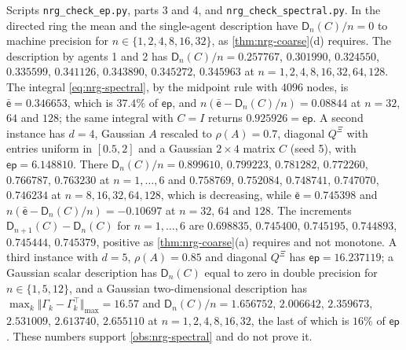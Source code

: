 \begin{numcheck}\label{chk:nrg-coarse}
Scripts \texttt{nrg\_\allowbreak check\_\allowbreak ep.py}, parts 3 and 4, and \texttt{nrg\_\allowbreak check\_\allowbreak spectral.py}. In the directed ring the mean and the single-agent description have $\mathsf D_n(C)/n=0$ to machine precision for $n\in\{1,2,4,8,16,32\}$, as \cref{thm:nrg-coarse}(d) requires. The description by agents 1 and 2 has $\mathsf D_n(C)/n=0.257767$, $0.301990$, $0.324550$, $0.335599$, $0.341126$, $0.343890$, $0.345272$, $0.345963$ at $n=1,2,4,8,16,32,64,128$. The integral \cref{eq:nrg-spectral}, by the midpoint rule with $4096$ nodes, is $\bar{\mathsf e}=0.346653$, which is $37.4\%$ of $\mathsf{ep}$, and $n(\bar{\mathsf e}-\mathsf D_n(C)/n)=0.08844$ at $n=32$, $64$ and $128$; the same integral with $C=I$ returns $0.925926=\mathsf{ep}$. A second instance has $d=4$, Gaussian $A$ rescaled to $\rho(A)=0.7$, diagonal $Q^{\Xi}$ with entries uniform in $[0.5,2]$ and a Gaussian $2\times4$ matrix $C$ (seed 5), with $\mathsf{ep}=6.148810$. There $\mathsf D_n(C)/n=0.899610$, $0.799223$, $0.781282$, $0.772260$, $0.766787$, $0.763230$ at $n=1,\dots,6$ and $0.758769$, $0.752084$, $0.748741$, $0.747070$, $0.746234$ at $n=8,16,32,64,128$, which is decreasing, while $\bar{\mathsf e}=0.745398$ and $n(\bar{\mathsf e}-\mathsf D_n(C)/n)=-0.10697$ at $n=32$, $64$ and $128$. The increments $\mathsf D_{n+1}(C)-\mathsf D_n(C)$ for $n=1,\dots,6$ are $0.698835$, $0.745400$, $0.745195$, $0.744893$, $0.745444$, $0.745379$, positive as \cref{thm:nrg-coarse}(a) requires and not monotone. A third instance with $d=5$, $\rho(A)=0.85$ and diagonal $Q^{\Xi}$ has $\mathsf{ep}=16.237119$; a Gaussian scalar description has $\mathsf D_n(C)$ equal to zero in double precision for $n\in\{1,5,12\}$, and a Gaussian two-dimensional description has $\max_k\Vert\Gamma_k-\Gamma_k^\top\Vert_{\max}=16.57$ and $\mathsf D_n(C)/n=1.656752$, $2.006642$, $2.359673$, $2.531009$, $2.613740$, $2.655110$ at $n=1,2,4,8,16,32$, the last of which is $16\%$ of $\mathsf{ep}$. These numbers support \cref{obs:nrg-spectral} and do not prove it.
\end{numcheck}

